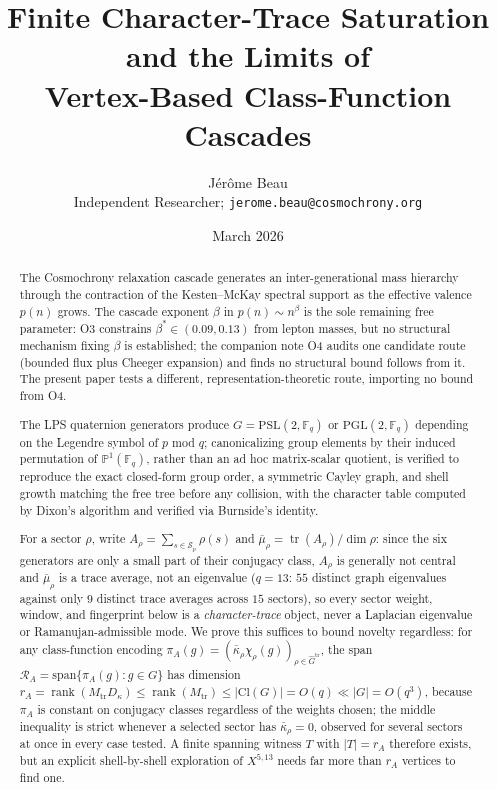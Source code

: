 \documentclass[11pt,a4paper]{article}
\theoremstyle{plain}
\theoremstyle{definition}
\theoremstyle{remark}
\newcommand{\F}{\mathbb{F}}
\newcommand{\Cl}{\mathrm{Cl}}
\newcommand{\rank}{\operatorname{rank}}
\newcommand{\PSL}{\mathrm{PSL}}
\newcommand{\adm}{\mathrm{tr}}
\newcommand{\Gadm}{\widehat{G}^{\adm}}
\newcommand{\Madm}{M_{\adm}}
\newcommand{\kap}{\bar\kappa_\rho}
\newcommand{\mubar}{\bar\mu_\rho}
\DeclareMathOperator{\tr}{tr}
\newcommand{\betastar}{\beta^*}
\newcommand{\piA}{\pi_A}
\begin{document}
  \title{%
    Finite Character-Trace Saturation and the Limits of\\
    Vertex-Based Class-Function Cascades%
  }

  \author{%
    J\'er\^ome Beau\\[4pt]
    \small Independent Researcher; \texttt{jerome.beau@cosmochrony.org}%
  }

  \date{March 2026}

  \maketitle

  \begin{abstract}
    The Cosmochrony relaxation cascade generates an inter-generational mass hierarchy through the
    contraction of the Kesten--McKay spectral support as the effective valence $p(n)$ grows.
    The cascade exponent $\beta$ in $p(n) \sim n^\beta$ is the sole remaining free parameter: O3
    constrains $\betastar \in (0.09, 0.13)$ from lepton masses, but no structural mechanism fixing
    $\beta$ is established; the companion note O4 audits one candidate route (bounded flux plus
    Cheeger expansion) and finds no structural bound follows from it.
    The present paper tests a different, representation-theoretic route, importing no bound from
    O4.

    The LPS quaternion generators produce $G = \PSL(2,\F_q)$ or $\mathrm{PGL}(2,\F_q)$ depending on
    the Legendre symbol of $p$ mod $q$; canonicalizing group elements by their induced permutation
    of $\mathbb{P}^1(\F_q)$, rather than an ad hoc matrix-scalar quotient, is verified to reproduce
    the exact closed-form group order, a symmetric Cayley graph, and shell growth matching the free
    tree before any collision, with the character table computed by Dixon's algorithm and verified
    via Burnside's identity.

    For a sector $\rho$, write $A_\rho=\sum_{s\in\mathcal S_p}\rho(s)$ and
    $\mubar=\tr(A_\rho)/\dim\rho$: since the six generators are only a small part of their
    conjugacy class, $A_\rho$ is generally not central and $\mubar$ is a trace average, not an
    eigenvalue ($q=13$: $55$ distinct graph eigenvalues against only $9$ distinct trace averages
    across $15$ sectors), so every sector weight, window, and fingerprint below is a
    \emph{character-trace} object, never a Laplacian eigenvalue or Ramanujan-admissible mode.
    We prove this suffices to bound novelty regardless: for any class-function encoding
    $\piA(g)=(\kap\chi_\rho(g))_{\rho\in\Gadm}$, the span $\mathcal R_A=\mathrm{span}\{\piA(g):g\in
    G\}$ has dimension $r_A=\rank(\Madm D_\kappa)\le\rank(\Madm)\le|\Cl(G)|=O(q)\ll|G|=O(q^3)$,
    because $\piA$ is constant on conjugacy classes regardless of the weights chosen; the middle
    inequality is strict whenever a selected sector has $\kap=0$, observed for several sectors at
    once in every case tested.
    A finite spanning witness $T$ with $|T|=r_A$ therefore exists, but an explicit shell-by-shell
    exploration of $X^{5,13}$ needs far more than $r_A$ vertices to find one.


\end{abstract}
\end{document}
